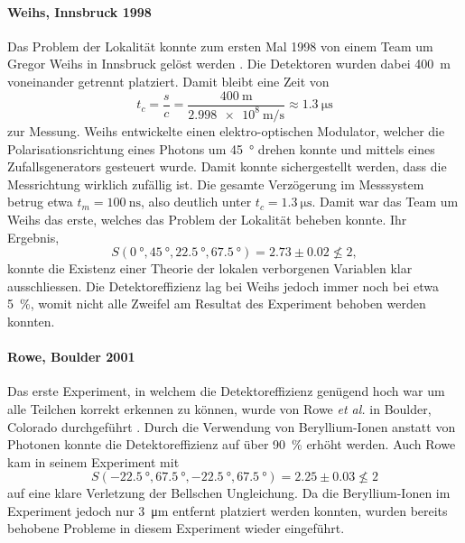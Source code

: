 \begin{refsection}
\paragraph{Weihs, Innsbruck 1998}
Das Problem der Lokalit\"at konnte zum ersten Mal 1998 von einem Team
um Gregor Weihs in Innsbruck gel\"ost werden \cite{Bell:Weihs1998}.
Die Detektoren wurden dabei \SI{400}{\meter} voneinander getrennt platziert.
Damit bleibt eine Zeit von
\[
    t_c = \frac{s}{c} = \frac{\SI{400}{\meter}}{\SI{2.998e8}{\meter\per\second}} \approx \SI{1.3}{\micro\second}
\]
zur Messung.
Weihs entwickelte einen elektro-optischen Modulator, welcher die 
Polarisationsrichtung eines Photons um \SI{45}{\degree} drehen konnte und
mittels eines Zufallsgenerators gesteuert wurde.
Damit konnte sichergestellt werden, dass die Messrichtung wirklich zuf\"allig
ist.
Die gesamte Verz\"ogerung im Messsystem betrug etwa 
$t_m = \SI{100}{\nano\second}$, also deutlich unter $t_c = \SI{1.3}{\micro\second}$. 
Damit war das Team um Weihs das erste, welches das Problem der Lokalit\"at
beheben konnte.
Ihr Ergebnis,
\[
    S(\SI{0}{\degree},\SI{45}{\degree},\SI{22.5}{\degree},\SI{67.5}{\degree})
    = 2.73 \pm 0.02 \nleqslant 2,
\]
konnte die Existenz einer Theorie der lokalen verborgenen Variablen klar 
ausschliessen.
Die Detektoreffizienz lag bei Weihs jedoch immer noch bei etwa \SI{5}{\percent},
womit nicht alle Zweifel am Resultat des Experiment behoben werden konnten.

\paragraph{Rowe, Boulder 2001}
Das erste Experiment, in welchem die Detektoreffizienz gen\"ugend hoch war um
alle Teilchen korrekt erkennen zu k\"onnen, wurde von Rowe \textit{et al.}
in Boulder, Colorado durchgef\"uhrt \cite{Bell:Rowe2001}. 
Durch die Verwendung von Beryllium-Ionen anstatt von Photonen konnte die
Detektoreffizienz auf \"uber \SI{90}{\percent} erh\"oht werden.
Auch Rowe kam in seinem Experiment mit
\[
    S(\SI{-22.5}{\degree},\SI{67.5}{\degree},\SI{-22.5}{\degree},\SI{67.5}{\degree})
    = 2.25 \pm 0.03 \nleqslant 2
\]
auf eine klare Verletzung der Bellschen Ungleichung.
Da die Beryllium-Ionen im Experiment jedoch nur \SI{3}{\micro\meter}
entfernt platziert werden konnten, wurden bereits behobene Probleme in
diesem Experiment wieder eingef\"uhrt.


\end{refsection}
